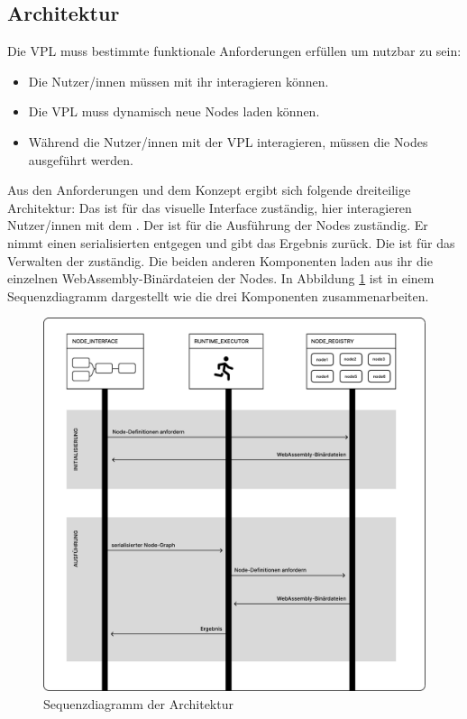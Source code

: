 \documentclass[ngerman]{article}
\begin{document}
\pagebreak


\subsection{Architektur}
\label{sec:Architektur}
Die VPL muss bestimmte funktionale Anforderungen erfüllen um nutzbar zu sein:
\begin{itemize}
  \item Die Nutzer/innen müssen mit ihr interagieren können.
  \item Die VPL muss dynamisch neue Nodes laden können.
  \item Während die Nutzer/innen mit der VPL interagieren, müssen die Nodes ausgeführt werden.
\end{itemize}
Aus den Anforderungen und dem Konzept ergibt sich folgende dreiteilige Architektur:
\br
Das  ist für das visuelle Interface zuständig, hier interagieren Nutzer/innen mit dem .
\br
Der  ist für die Ausführung der Nodes zuständig. Er nimmt einen serialisierten  entgegen und gibt das Ergebnis zurück.
\br
Die  ist für das Verwalten der  zuständig. Die beiden anderen Komponenten laden aus ihr die einzelnen WebAssembly-Binärdateien der Nodes.
\br
In Abbildung \ref{fig:overview_sequence} ist in einem Sequenzdiagramm dargestellt wie die drei Komponenten zusammenarbeiten.

\begin{figure}[hbtp]
    \centering
    \includegraphics[width=1\textwidth]{graphics/OVERVIEW_SEQUENCE.pdf}
    \caption{Sequenzdiagramm der Architektur}
    \label{fig:overview_sequence}
\end{figure}
\end{document}
